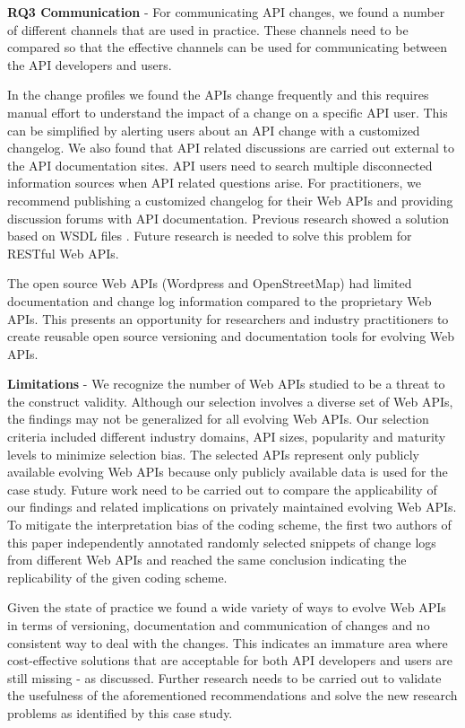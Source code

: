 \textbf{RQ3 Communication} - For communicating API changes, we found a number of different channels that are used in practice. These channels need to be compared so that the effective channels can be used for communicating between the API developers and users.

In the change profiles we found the APIs change frequently and this requires manual effort to understand the impact of a change on a specific API user. This can be simplified by alerting users about an API change with a customized changelog. We also found that API related discussions are carried out external to the API documentation sites. API users need to search multiple disconnected information sources when API related questions arise. For practitioners, we recommend publishing a customized changelog for their Web APIs and providing discussion forums with API documentation. Previous research showed a solution based on WSDL files \cite{le2008synchronizing}. Future research is needed to solve this problem for RESTful Web APIs.

The open source Web APIs (Wordpress and OpenStreetMap) had limited documentation and change log information compared to the proprietary Web APIs. This presents an opportunity for researchers and industry practitioners to create reusable open source versioning and documentation tools for evolving Web APIs.

\textbf{Limitations} - We recognize the number of Web APIs studied to be a threat to the construct validity. Although our selection involves a diverse set of Web APIs, the findings may not be generalized for all evolving Web APIs. Our selection criteria included different industry domains, API sizes, popularity and maturity levels to minimize selection bias. The selected APIs represent only publicly available evolving Web APIs because only publicly available data is used for the case study. Future work need to be carried out to compare the applicability of our findings and related implications on privately maintained evolving Web APIs. To mitigate the interpretation bias of the coding scheme, the first two authors of this paper independently annotated randomly selected snippets of change logs from different Web APIs and reached the same conclusion indicating the replicability of the given coding scheme.

Given the state of practice we found a wide variety of ways to evolve Web APIs in terms of versioning, documentation and communication of changes and no consistent way to deal with the changes. This indicates an immature area where cost-effective solutions that are acceptable for both API developers and users are still missing - as discussed. Further research needs to be carried out to validate the usefulness of the aforementioned recommendations and solve the new research problems as identified by this case study.

